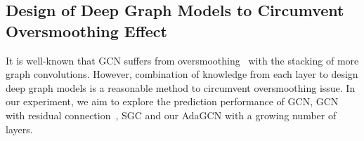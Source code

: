 \documentclass{article} \usepackage{iclr2021_conference,times}
\begin{document}
\begin{table}[b!]
\centering
	\caption{Average accuracy under 100 runs with uncertainties showing the 95 \% confidence level calculated by bootstrapping. OOM denotes ``out of memory''. ``(ours)'' denotes the results based on our implementation, which are slight lower than numbers above from original literature~\citep{klicpera2018predict}. P values of paired t test between APPNP~(ours) and AdaGCN are provided in the last row.}
	\label{table_performance}
\end{table}

\subsection{Design of Deep Graph Models to Circumvent Oversmoothing Effect}\label{experiment_deep}

It is well-known that GCN suffers from oversmoothing~\citep{li2018deeper} with the stacking of more graph convolutions. However, combination of knowledge from each layer to design deep graph models is a reasonable method to circumvent oversmoothing issue. In our experiment, we aim to explore the prediction performance of GCN, GCN with residual connection~\citep{kipf2016semi}, SGC and our AdaGCN with a growing number of layers. 
\end{document}
